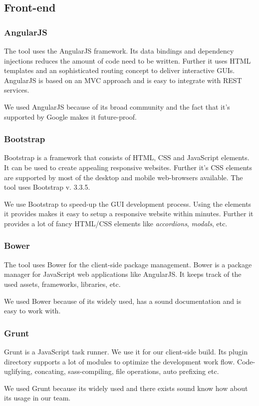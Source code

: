 \subsection{Front-end}

\subsubsection{AngularJS}
The tool uses the AngularJS framework. Its data bindings and dependency injections reduces the amount of code need to be written. Further it uses HTML templates and an sophisticated routing concept to deliver interactive GUIs. AngularJS is based on an MVC approach and is easy to integrate with REST services.\cite{angular}\par
We used AngularJS because of its broad community and the fact that it's supported by Google makes it future-proof.

\subsubsection{Bootstrap}
Bootstrap is a framework that consists of HTML, CSS and JavaScript elements. It can be used to create appealing responsive websites. Further it's CSS elements are supported by most of the desktop and mobile web-browsers available. The tool uses Bootstrap v. 3.3.5. \cite{bootstrap}\par
We use Bootstrap to speed-up the GUI development process. Using the elements it provides makes it easy to setup a responsive website within minutes. Further it provides a lot of fancy HTML/CSS elements like \textit{accordions}, \textit{modals}, etc.

\subsubsection{Bower}
The tool uses Bower for the client-side package management. Bower is a package manager for JavaScript web applications like AngularJS. It keeps track of the used assets, frameworks, libraries, etc. \cite{bower} \par
We used Bower because of its widely used, has a sound documentation and is easy to work with.

\subsubsection{Grunt}
Grunt is a JavaScript task runner. We use it for our client-side build. Its plugin directory supports a lot of modules to optimize the development work flow. Code-uglifying, concating, sass-compiling, file operations, auto prefixing etc. \cite{grunt} \par
We used Grunt because its widely used and there exists sound know how about its usage in our team.
